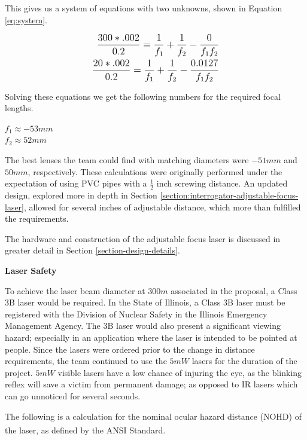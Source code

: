 \documentclass[letterpaper,10pt]{article}
\begin{document}
\begin{spacing}{1.15}
This gives us a system of equations with two unknowns, shown in Equation \ref{eq:system}. 

 \begin{align} \label{eq:system} \large \begin{split}
\frac{300*.002}{0.2} =  \frac{1}{f_1} + \frac{1}{f_2} - \frac{0}{f_1 f_2}
 \\
 \frac{20*.002}{0.2} =  \frac{1}{f_1} + \frac{1}{f_2} - \frac{0.0127}{f_1 f_2}
 \end{split}
 \end{align}

Solving these equations we get the following numbers for the required focal lengths.
\begin{center}
	\large
	$f_1 \approx -53mm$ \\
	$f_2 \approx  52mm$
\end{center}

The best lenses the team could find with matching diameters were $-51mm$ and $50mm$, respectively. These calculations were originally performed under the expectation of using PVC pipes with a $\frac{1}{2}$ inch screwing distance. An updated design, explored more in depth in Section \ref{section:interrogator-adjustable-focus-laser}, allowed for several inches of adjustable distance, which more than fulfilled the requirements. 

The hardware and construction of the adjustable focus laser is discussed in greater detail in Section \ref{section-design-details}. 

\hspace{5mm}\textbf{Laser Safety}

 To achieve the laser beam diameter at $300 m$ associated in the proposal, a Class 3B laser would be required. In the State of Illinois, a Class 3B laser must be registered with the Division of Nuclear Safety in the Illinois Emergency Management Agency. The 3B laser would also present a significant viewing hazard; especially in an application where the laser is intended to be pointed at people. Since the lasers were ordered prior to the change in distance requirements, the team continued to use the $5mW$ lasers for the duration of the project. $5mW$ visible lasers have a low chance of injuring the eye, as the blinking reflex will save a victim from permanent damage; as opposed to IR lasers which can go unnoticed for several seconds. 
 
 The following is a calculation for the nominal ocular hazard distance (NOHD) of the laser, as defined by the ANSI Standard\textsuperscript{\cite{ANSI}}.
 

\end{spacing}
\end{document}
